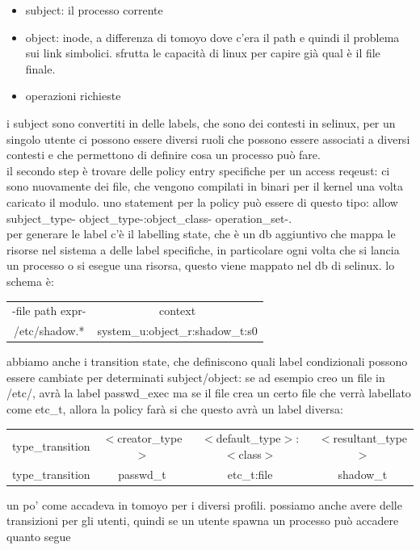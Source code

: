 \documentclass[12pt, oneside]{extbook} %
\begin{document}
\begin{itemize}
\item subject: il processo corrente
\item object: inode, a differenza di tomoyo dove c'era il path e quindi il problema sui link simbolici. sfrutta le capacità di linux per capire già qual è il file finale.
\item operazioni richieste
\end{itemize}
i subject sono convertiti in delle labels, che sono dei contesti in selinux, per un singolo utente ci possono essere diversi ruoli che possono essere associati a diversi contesti e che permettono di definire cosa un processo può fare.\\il secondo step è trovare delle policy entry specifiche per un access reqeust: ci sono nuovamente dei file, che vengono compilati in binari per il kernel una volta caricato il modulo. uno statement per la policy può essere di questo tipo: allow \-subject\_type- \-object\_type-:\-object\_class- \-operation\_set-.\\per generare le label c'è il labelling state, che è un db aggiuntivo che mappa le risorse nel sistema a delle label specifiche, in particolare ogni volta che si lancia un processo o si esegue una risorsa, questo viene mappato nel db di selinux. lo schema è:
\begin{tabular}{|c|c}
-file path expr- & context\\
/etc/shadow.* & system\_u:object\_r:shadow\_t:s0\\
\end{tabular}
abbiamo anche i transition state, che definiscono quali label condizionali possono essere cambiate per determinati subject/object: se ad esempio creo un file in /etc/, avrà la label passwd\_exec ma se il file crea un certo file che verrà labellato come etc\_t, allora la policy farà si che questo avrà un label diversa:
\begin{table}[!h]
	\begin{tabular}{c c c c}
		type\_transition & $<$creator\_type$>$ & $<$default\_type$>$:$<$class$>$ & $<$resultant\_type$>$\\
		type\_transition & passwd\_t & etc\_t:file & shadow\_t\\
	\end{tabular}
\end{table}
un po' come accadeva in tomoyo per i diversi profili. possiamo anche avere delle transizioni per gli utenti, quindi se un utente spawna un processo può accadere quanto segue\\
\end{document}
